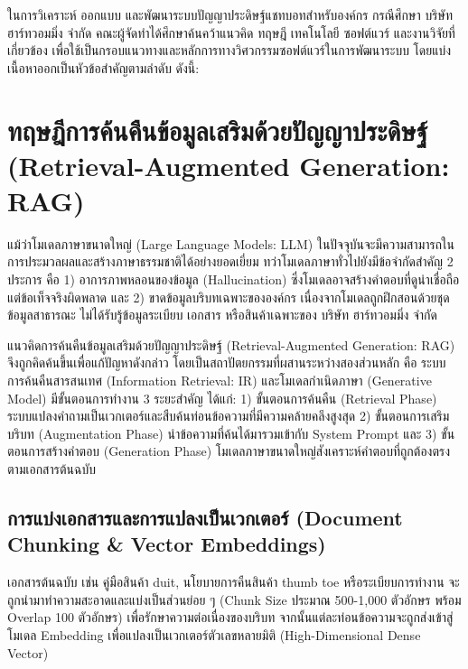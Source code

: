 \providecommand{\cmark}{\ensuremath{\checkmark}}
\providecommand{\xmark}{\ensuremath{\times}}
\vspace{0.2in}
\hspace*{1.3em}
ในการวิเคราะห์ ออกแบบ และพัฒนาระบบปัญญาประดิษฐ์แชทบอทสำหรับองค์กร กรณีศึกษา บริษัท ฮาร์ทวอมมิ่ง จำกัด คณะผู้จัดทำได้ศึกษาค้นคว้าแนวคิด ทฤษฎี เทคโนโลยี ซอฟต์แวร์ และงานวิจัยที่เกี่ยวข้อง เพื่อใช้เป็นกรอบแนวทางและหลักการทางวิศวกรรมซอฟต์แวร์ในการพัฒนาระบบ โดยแบ่งเนื้อหาออกเป็นหัวข้อสำคัญตามลำดับ ดังนี้:

\section{ทฤษฎีการค้นคืนข้อมูลเสริมด้วยปัญญาประดิษฐ์ (Retrieval-Augmented Generation: RAG)}
\hspace*{1.3em}
แม้ว่าโมเดลภาษาขนาดใหญ่ (Large Language Models: LLM) ในปัจจุบันจะมีความสามารถในการประมวลผลและสร้างภาษาธรรมชาติได้อย่างยอดเยี่ยม ทว่าโมเดลภาษาทั่วไปยังมีข้อจำกัดสำคัญ 2 ประการ คือ 1) อาการภาพหลอนของข้อมูล (Hallucination) ซึ่งโมเดลอาจสร้างคำตอบที่ดูน่าเชื่อถือแต่ข้อเท็จจริงผิดพลาด และ 2) ขาดข้อมูลบริบทเฉพาะขององค์กร เนื่องจากโมเดลถูกฝึกสอนด้วยชุดข้อมูลสาธารณะ ไม่ได้รับรู้ข้อมูลระเบียบ เอกสาร หรือสินค้าเฉพาะของ บริษัท ฮาร์ทวอมมิ่ง จำกัด

\hspace*{1.3em}
แนวคิดการค้นคืนข้อมูลเสริมด้วยปัญญาประดิษฐ์ (Retrieval-Augmented Generation: RAG) จึงถูกคิดค้นขึ้นเพื่อแก้ปัญหาดังกล่าว โดยเป็นสถาปัตยกรรมที่ผสานระหว่างสองส่วนหลัก คือ ระบบการค้นคืนสารสนเทศ (Information Retrieval: IR) และโมเดลกำเนิดภาษา (Generative Model) มีขั้นตอนการทำงาน 3 ระยะสำคัญ ได้แก่: 1) ขั้นตอนการค้นคืน (Retrieval Phase) ระบบแปลงคำถามเป็นเวกเตอร์และสืบค้นท่อนข้อความที่มีความคล้ายคลึงสูงสุด 2) ขั้นตอนการเสริมบริบท (Augmentation Phase) นำข้อความที่ค้นได้มารวมเข้ากับ System Prompt และ 3) ขั้นตอนการสร้างคำตอบ (Generation Phase) โมเดลภาษาขนาดใหญ่สังเคราะห์คำตอบที่ถูกต้องตรงตามเอกสารต้นฉบับ

\subsection{การแบ่งเอกสารและการแปลงเป็นเวกเตอร์ (Document Chunking \& Vector Embeddings)}
\hspace*{1.3em}
เอกสารต้นฉบับ เช่น คู่มือสินค้า duit, นโยบายการคืนสินค้า thumb toe หรือระเบียบการทำงาน จะถูกนำมาทำความสะอาดและแบ่งเป็นส่วนย่อย ๆ (Chunk Size ประมาณ 500-1,000 ตัวอักษร พร้อม Overlap 100 ตัวอักษร) เพื่อรักษาความต่อเนื่องของบริบท จากนั้นแต่ละท่อนข้อความจะถูกส่งเข้าสู่โมเดล Embedding เพื่อแปลงเป็นเวกเตอร์ตัวเลขหลายมิติ (High-Dimensional Dense Vector)


